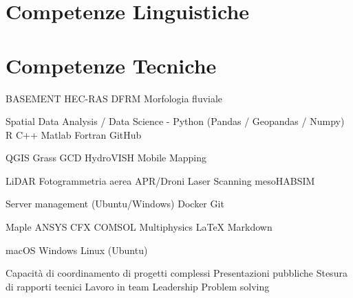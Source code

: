 
\section{Competenze Linguistiche}

\sectionsep

\sectionsep

\sectionsep

\section{Competenze Tecniche}

BASEMENT \textbullet{} HEC-RAS \textbullet{} DFRM \textbullet{} Morfologia fluviale
\sectionsep

Spatial Data Analysis / Data Science - Python (Pandas / Geopandas / Numpy) \textbullet{} R \textbullet{} C++ \textbullet{} Matlab \textbullet{} Fortran \textbullet{} GitHub
\sectionsep

QGIS \textbullet{} Grass \textbullet{} GCD \textbullet{} HydroVISH \textbullet{} Mobile Mapping
\sectionsep

LiDAR \textbullet{} Fotogrammetria aerea \textbullet{} APR/Droni \textbullet{} Laser Scanning \textbullet{} mesoHABSIM
\sectionsep

Server management (Ubuntu/Windows) \textbullet{} Docker \textbullet{} Git
\sectionsep

Maple \textbullet{} ANSYS CFX \textbullet{} COMSOL Multiphysics \textbullet{} LaTeX \textbullet{} Markdown
\sectionsep

macOS \textbullet{} Windows \textbullet{} Linux (Ubuntu)
\sectionsep

Capacità di coordinamento di progetti complessi \textbullet{} Presentazioni pubbliche \textbullet{} Stesura di rapporti tecnici \textbullet{} Lavoro in team \textbullet{} Leadership \textbullet{} Problem solving
\sectionsep
